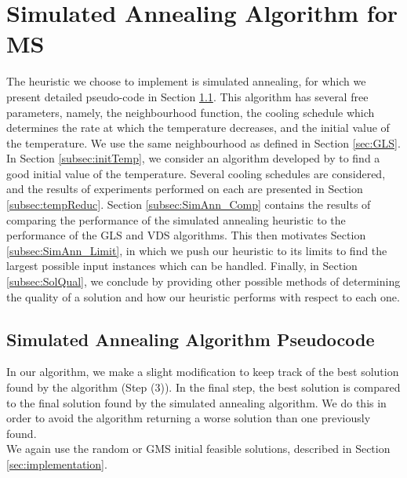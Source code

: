 \documentclass[12pt,a4paper,reqno]{article}
\begin{document}
\newpage
\section{Simulated Annealing Algorithm for MS}
\label{sec:simulatedannealing}

The heuristic we choose to implement is simulated annealing, for which we present detailed pseudo-code in Section \ref{subsec:SA_pseudo}. This algorithm has several free parameters, namely, the neighbourhood function, the cooling schedule which determines the rate at which the temperature decreases, and the initial value of the temperature. We use the same neighbourhood as defined in Section \ref{sec:GLS}. \\

In Section \ref{subsec:initTemp}, we consider an algorithm developed by \citet{ameur2004} to find a good initial value of the temperature. Several cooling schedules are considered, and the results of experiments performed on each are presented in Section \ref{subsec:tempReduc}. Section \ref{subsec:SimAnn_Comp} contains the results of comparing the performance of the simulated annealing heuristic to the performance of the GLS and VDS algorithms. This then motivates Section \ref{subsec:SimAnn_Limit}, in which we push our heuristic to its limits to find the largest possible input instances which can be handled. Finally, in Section \ref{subsec:SolQual}, we conclude by providing other possible methods of determining the quality of a solution and how our heuristic performs with respect to each one.

\subsection{Simulated Annealing Algorithm Pseudocode}
\label{subsec:SA_pseudo}
In our algorithm, we make a slight modification to keep track of the best solution found by the algorithm (Step (3)). In the final step, the best solution is compared to the final solution found by the simulated annealing algorithm. We do this in order to avoid the algorithm returning a worse solution than one previously found. \\

We again use the random or GMS initial feasible solutions, described in Section \ref{sec:implementation}. \\
\end{document}
